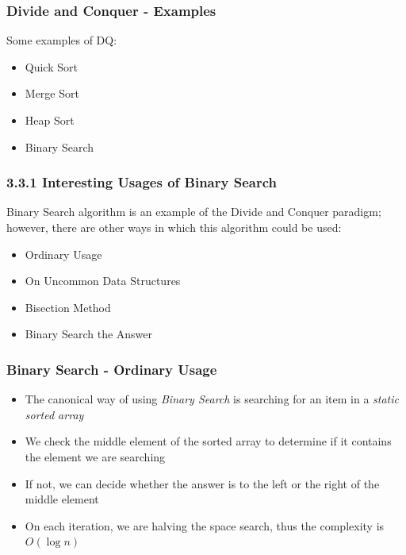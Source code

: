 \documentclass{beamer}
\begin{document}
\begin{frame}
\frametitle{Divide and Conquer - Examples}

Some examples of DQ:

\begin{itemize}
    \item Quick Sort
    \item Merge Sort
    \item Heap Sort
    \item Binary Search
\end{itemize}

\end{frame}

\begin{frame}[fragile]
\frametitle{3.3.1 Interesting Usages of Binary Search}

Binary Search algorithm is an example of the Divide and Conquer paradigm; however, there are other ways in which this algorithm could be used: 

\begin{itemize}
    \item Ordinary Usage
    \item On Uncommon Data Structures
    \item Bisection Method
    \item Binary Search the Answer
\end{itemize}

\end{frame}

\begin{frame}[fragile]
\frametitle{Binary Search - Ordinary Usage}

\begin{itemize}
    \item The canonical way of using \textit{Binary Search} is searching for an item in a \textit{static sorted array}
    \item We check the middle element of the sorted array to determine if it contains the element we are searching
    \item If not, we can decide whether the answer is to the left or the right of the middle element
    \item On each iteration, we are halving the space search, thus the complexity is $O(\log n)$
\end{itemize}

\end{frame}
\end{document}

